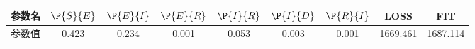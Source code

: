 \begin{tabular}{ccccccccc}
\hline
参数名&$\P{S}{E}$&$\P{E}{I}$&$\P{E}{R}$&$\P{I}{R}$&$\P{I}{D}$&$\P{R}{I}$&LOSS&FIT\\
\hline
参数值&0.423&0.234&0.001&0.053&0.003&0.001&1669.461&1687.114\\
\hline
\end{tabular}